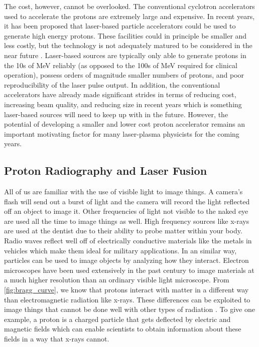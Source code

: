 The cost, however, cannot be overlooked. The conventional cyclotron accelerators used to accelerate the protons are extremely large and expensive. In recent years, it has been proposed that laser-based particle accelerators could be used to generate high energy protons. These facilities could in principle be smaller and less costly, but the technology is not adequately matured to be considered in the near future \cite{Linz_2016_LaPB}. Laser-based sources are typically only able to generate protons in the 10s of MeV reliably (as opposed to the 100s of MeV required for clinical operation), possess orders of magnitude smaller numbers of protons, and poor reproducibility of the laser pulse output. In addition, the conventional accelerators have already made significant strides in terms of reducing cost, increasing beam quality, and reducing size in recent years \cite{Linz_2016_LaPB} which is something laser-based sources will need to keep up with in the future. However, the potential of developing a smaller and lower cost proton accelerator remains an important motivating factor for many laser-plasma physicists for the coming years.

\subsection{Proton Radiography and Laser Fusion}

All of us are familiar with the use of visible light to image things. A camera's flash will send out a burst of light and the camera will record the light reflected off an object to image it. Other frequencies of light not visible to the naked eye are used all the time to image things as well. High frequency sources like x-rays are used at the dentist due to their ability to probe matter within your body. Radio waves reflect well off of electrically conductive materials like the metals in vehicles which make them ideal for military applications. In an similar way, particles can be used to image objects by analyzing how they interact. Electron microscopes have been used extensively in the past century to image materials at a much higher resolution than an ordinary visible light microscope. From \autoref{fig:bragg_curve}, we know that protons interact with matter in a different way than electromagnetic radiation like x-rays. These differences can be exploited to image things that cannot be done well with other types of radiation \cite{Schaeffer_2023_RevMod}. To give one example, a proton is a charged particle that gets deflected by electric and magnetic fields which can enable scientists to obtain information about these fields in a way that x-rays cannot.


